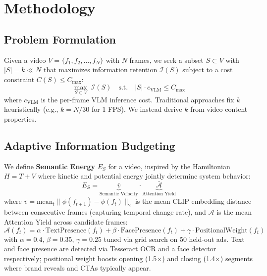 \section{Methodology}
\label{sec:methodology}

\subsection{Problem Formulation}

Given a video $V = \{f_1, f_2, \ldots, f_N\}$ with $N$ frames, we seek a subset $S \subset V$ with $|S| = k \ll N$ that maximizes information retention $\mathcal{I}(S)$ subject to a cost constraint $C(S) \leq C_{\max}$:
\begin{equation}
\label{eq:optimization}
\max_{S \subset V} \; \mathcal{I}(S) \quad \text{s.t.} \quad |S| \cdot c_{\text{VLM}} \leq C_{\max}
\end{equation}
where $c_{\text{VLM}}$ is the per-frame VLM inference cost. Traditional approaches fix $k$ heuristically (e.g., $k = N/30$ for 1 FPS). We instead derive $k$ from video content properties.

\subsection{Adaptive Information Budgeting}
\label{sec:budget}

We define \textbf{Semantic Energy} $E_S$ for a video, inspired by the Hamiltonian $H = T + V$ where kinetic and potential energy jointly determine system behavior:
\begin{equation}
\label{eq:semantic_energy}
E_S = \underbrace{\bar{v}}_{\text{Semantic Velocity}} \cdot \underbrace{\bar{\mathcal{A}}}_{\text{Attention Yield}}
\end{equation}
where $\bar{v} = \text{mean}_t \|\phi(f_{t+1}) - \phi(f_t)\|_2$ is the mean CLIP embedding distance between consecutive frames (capturing temporal change rate), and $\bar{\mathcal{A}}$ is the mean Attention Yield across candidate frames:
\begin{equation}
\label{eq:attention_yield}
\mathcal{A}(f_t) = \alpha \cdot \text{TextPresence}(f_t) + \beta \cdot \text{FacePresence}(f_t) + \gamma \cdot \text{PositionalWeight}(f_t)
\end{equation}
with $\alpha = 0.4$, $\beta = 0.35$, $\gamma = 0.25$ tuned via grid search on 50 held-out ads. Text and face presence are detected via Tesseract OCR and a face detector respectively; positional weight boosts opening (1.5$\times$) and closing (1.4$\times$) segments where brand reveals and CTAs typically appear.

